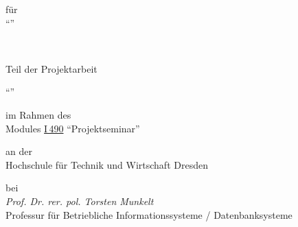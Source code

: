 \begin{titlepage}
	\centering
\vfill
	{
		\scshape\Huge \DOCNAME \par
	}
	\vspace{1cm}
	{
		\LARGE für \\%
		\enquote{\ProjTitle{}} \par
	}




\vfill

\newpage


\,

\vspace{4cm}

{

{
	\large{ Teil der Projektarbeit } \par \vspace{.2cm}
	\LARGE{ \enquote{\ProjTitle{}} }
	\par \vspace{.4cm}
	\scriptsize {
		im Rahmen des
	} \\
	Modules \href{https://apps.htw-dresden.de/modulux.php?mod=2071}{I\,490} \enquote{Projektseminar} \par \vspace{.3cm}

	\scriptsize{
		an der
	} \\
	\large{
		Hochschule für Technik und Wirtschaft Dresden
	}

		\par \vspace{.5cm}
		\centering
		\par \vspace{.3cm}

	\scriptsize{
		bei
	} \\
	\emph{
		Prof. Dr. rer. pol. Torsten Munkelt
	} \\
	\footnotesize{
		Professur für Betriebliche Informationssysteme / Datenbanksysteme
	} \par \vspace{.3cm}

}}
\end{titlepage}

